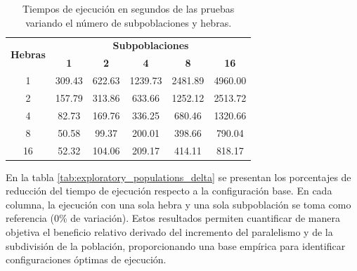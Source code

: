 \begin{table}[ht]
    \centering
    \begin{tabular}{|c|ccccc|}
        \hline
        \multirow{2}{*}{\textbf{Hebras}} & \multicolumn{5}{c|}{\textbf{Subpoblaciones}}                                                      \\ \cline{2-6}
                                         & \textbf{1}                                   & \textbf{2} & \textbf{4} & \textbf{8} & \textbf{16} \\ \hline
        1                                & 309.43                                       & 622.63     & 1239.73    & 2481.89    & 4960.00     \\ \hline
        2                                & 157.79                                       & 313.86     & 633.66     & 1252.12    & 2513.72     \\ \hline
        4                                & 82.73                                        & 169.76     & 336.25     & 680.46     & 1320.66     \\ \hline
        8                                & 50.58                                        & 99.37      & 200.01     & 398.66     & 790.04      \\ \hline
        16                               & 52.32                                        & 104.06     & 209.17     & 414.11     & 818.17      \\ \hline
    \end{tabular}
    \caption{Tiempos de ejecución en segundos de las pruebas variando el número de subpoblaciones y hebras.}
    \label{tab:exploratory_subpopulations_times}
\end{table}

En la tabla \ref{tab:exploratory_populations_delta} se presentan los porcentajes de reducción del tiempo de ejecución respecto a la configuración base. En cada columna, la ejecución con una sola hebra y una sola subpoblación se toma como referencia (0\% de variación). Estos resultados permiten cuantificar de manera objetiva el beneficio relativo derivado del incremento del paralelismo y de la subdivisión de la población, proporcionando una base empírica para identificar configuraciones óptimas de ejecución.

